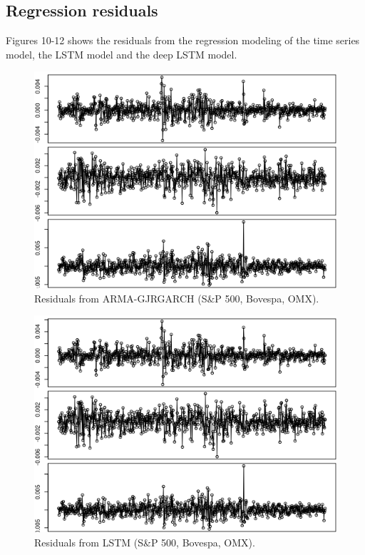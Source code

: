 \documentclass[12pt, letterpaper]{amsart}%
\begin{document}
\subsection{Regression residuals}
Figures 10-12 shows the residuals from the regression modeling of the time series model, the LSTM model and the deep LSTM model.


\begin{figure}
\caption{Residuals from ARMA-GJRGARCH (S\&P 500, Bovespa, OMX).}
\centering
\includegraphics[scale=0.8]{garch_resid.png}
\end{figure}

\begin{figure}[H]
\caption{Residuals from LSTM (S\&P 500, Bovespa, OMX).}
\centering
\includegraphics[scale=0.8]{lstm_resid.png}
\end{figure}
\end{document}

